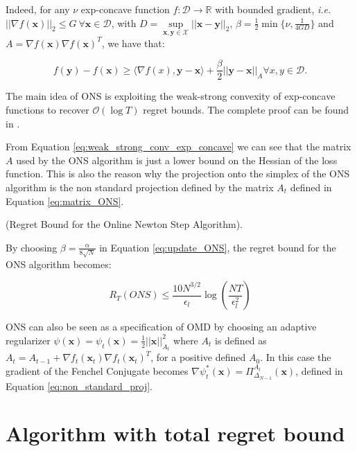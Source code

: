 Indeed, for any $\nu$ exp-concave function $f:\mathcal D\to\mathbb R$ with bounded gradient, \emph{i.e.} $||\nabla f(\mathbf x)||_2\le G\ \forall \mathbf x\in\mathcal D$, with $D=\sup\limits_{\mathbf x,\mathbf y\in\mathcal X}||\mathbf x-\mathbf y||_2$, $\beta=\frac{1}{2}\min\{\nu,\frac{1}{4GD}\}$ and $A=\nabla f(\mathbf x)\nabla f(\mathbf x)^T$, we have that: 

\begin{equation}\label{eq:weak_strong_conv_exp_concave}
f(\mathbf y)-f(\mathbf x)\ge\langle\nabla f(x),\mathbf y-\mathbf x\rangle+\frac{\beta}{2}||\mathbf y-\mathbf x||_{A}\forall x,y\in\mathcal D.
\end{equation}

The main idea of ONS is exploiting the weak-strong convexity of exp-concave functions to recover $\mathcal O(\log T)$ regret bounds. The complete proof can be found in \cite{hazan2007logarithmic}.

From Equation \eqref{eq:weak_strong_conv_exp_concave} we can see that the matrix $A$ used by the ONS algorithm is just a lower bound on the Hessian of the loss function. This is also the reason why the projection onto the simplex of the ONS algorithm is the non standard projection defined by the matrix $A_t$ defined in Equation \eqref{eq:matrix_ONS}.

\begin{theorem}(Regret Bound for the Online Newton Step Algorithm).

By choosing $\beta=\frac{\alpha}{8\sqrt{N}}$ in Equation \eqref{eq:update_ONS}, the regret bound for the ONS algorithm becomes:

\begin{equation}\label{eq:regret_ONS}
R_T(ONS)\le\frac{10 N^{3/2}}{\epsilon_l}\log\left(\frac{NT}{\epsilon_l^2}\right)
\end{equation}
\end{theorem}

ONS can also be seen as a specification of OMD \cite{luo2018efficient} by choosing an adaptive regularizer $\psi(\mathbf x)=\psi_t(\mathbf x)=\frac{1}{2}||\mathbf x||_{A_t}^2$ where $A_t$ is defined as $A_t=A_{t-1}+\nabla f_t(\mathbf x_t)\nabla f_t(\mathbf x_t)^T$, for a positive defined $A_0$. In this case the gradient of the Fenchel Conjugate becomes $\nabla \psi_t^*(\mathbf x)=\Pi^{A_t}_{\Delta_{N-1}}(\mathbf x)$, defined in Equation \eqref{eq:non_standard_proj}.

\section{Algorithm with total regret bound}


